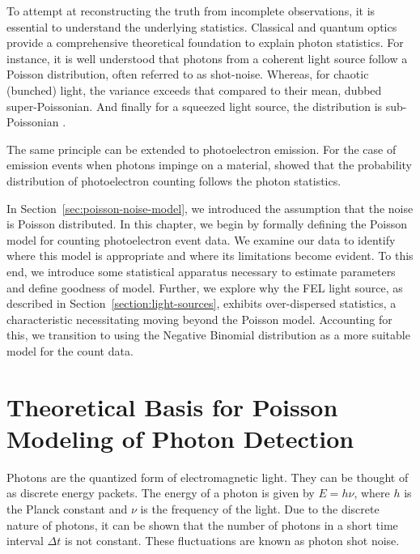 To attempt at reconstructing the truth from incomplete observations, it is essential to understand the underlying statistics.   Classical and quantum optics provide a comprehensive theoretical foundation to explain photon statistics. For instance, it is well understood that photons from a coherent light source follow a Poisson distribution, often referred to as shot-noise. Whereas, for chaotic (bunched) light, the variance exceeds that compared to their mean, dubbed super-Poissonian. And finally for a squeezed light source, the distribution is sub-Poissonian \cite[Chapter~5]{foxQuantumOpticsIntroduction2006}.

The same principle can be extended to photoelectron emission. For the case of emission events when photons impinge on a material, \citeauthor{mandelFluctuationsPhotonBeams1958} \cite{mandelFluctuationsPhotonBeams1958,mandelFluctuationsPhotonBeams1959} showed that the probability distribution of photoelectron counting follows the photon statistics.

In Section~\ref{sec:poisson-noise-model}, we introduced the assumption that the noise is Poisson distributed. In this chapter, we begin by formally defining the Poisson model for counting photoelectron event data. We examine our data to identify where this model is appropriate and where its limitations become evident. To this end, we introduce some statistical apparatus necessary to estimate parameters and define goodness of model. Further, we explore why the \gls{FEL} light source, as described in Section~\ref{section:light-sources}, exhibits over-dispersed statistics, a characteristic necessitating moving beyond the Poisson model. Accounting for this, we transition to using the Negative Binomial distribution as a more suitable model for the count data.

\section{Theoretical Basis for Poisson Modeling of Photon Detection}\label{section:photon-counting-stats}

Photons are the quantized form of electromagnetic light. They can be thought of as discrete energy packets. The energy of a photon is given by $E = h\nu$, where $h$ is the Planck constant and $\nu$ is the frequency of the light. Due to the discrete nature of photons, it can be shown that the number of photons in a short time interval $\Delta t$ is not constant. These fluctuations are known as photon shot noise.

